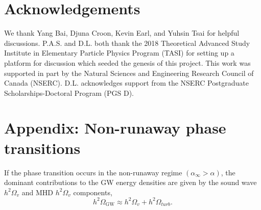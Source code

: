 \documentclass[nofootinbib,twocolumn,preprintnumbers]{revtex4-1}
\begin{document}

\section*{Acknowledgements}

We thank Yang Bai, Djuna Croon, Kevin Earl, and Yuhsin Tsai for helpful discussions. P.A.S. and D.L. both thank the 2018 Theoretical Advanced Study Institute in Elementary Particle Physics Program (TASI) for setting up a platform for discussion which seeded the genesis of this project. This work was supported in part by the Natural Sciences and Engineering Research Council of Canada (NSERC). D.L. acknowledges support from the NSERC Postgraduate Scholarships-Doctoral Program (PGS D).

\appendix
\section*{Appendix: Non-runaway phase transitions}
\label{sec:appendix}

If the phase transition occurs in the non-runaway regime $(\alpha_{\infty} > \alpha)$, the dominant contributions to the GW energy densities are given by the sound wave $h^2\Omega_{v}$ and MHD $h^2\Omega_{v}$ components,
\begin{equation}\label{eqn:Spectralnonrun}
h^2\Omega_{\textrm{GW}} \approx  h^2\Omega_{v} + h^2\Omega_{turb}.
\end{equation}
\end{document}
